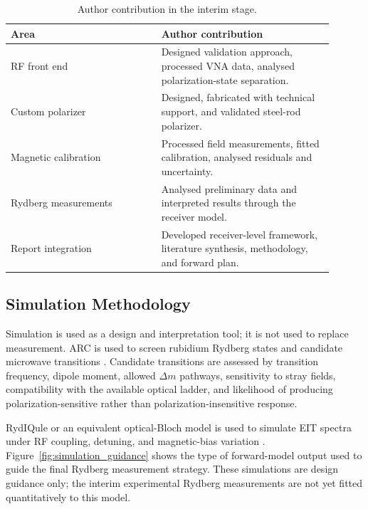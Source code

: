 \documentclass{ieeeaccess}
\begin{document}
\begin{table}[!t]
\caption{Author contribution in the interim stage.}
\label{tab:author_contribution}
\centering
\renewcommand{\arraystretch}{1.10}
\scriptsize
\begin{tabular}{p{0.42\linewidth} p{0.48\linewidth}}
\hline
\textbf{Area} & \textbf{Author contribution} \\
\hline
RF front end & Designed validation approach, processed VNA data, analysed polarization-state separation. \\
Custom polarizer & Designed, fabricated with technical support, and validated steel-rod polarizer. \\
Magnetic calibration & Processed field measurements, fitted calibration, analysed residuals and uncertainty. \\
Rydberg measurements & Analysed preliminary data and interpreted results through the receiver model. \\
Report integration & Developed receiver-level framework, literature synthesis, methodology, and forward plan. \\
\hline
\end{tabular}
\end{table}

\subsection{Simulation Methodology}
\label{subsec:method_simulation}

Simulation is used as a design and interpretation tool; it is not used to replace measurement. ARC is used to screen rubidium Rydberg states and candidate microwave transitions \cite{Sibalic2017ARC}. Candidate transitions are assessed by transition frequency, dipole moment, allowed \(\Delta m\) pathways, sensitivity to stray fields, compatibility with the available optical ladder, and likelihood of producing polarization-sensitive rather than polarization-insensitive response.

RydIQule or an equivalent optical-Bloch model is used to simulate EIT spectra under RF coupling, detuning, and magnetic-bias variation \cite{Rydiqule2024}. Figure~\ref{fig:simulation_guidance} shows the type of forward-model output used to guide the final Rydberg measurement strategy. These simulations are design guidance only; the interim experimental Rydberg measurements are not yet fitted quantitatively to this model.
\end{document}
